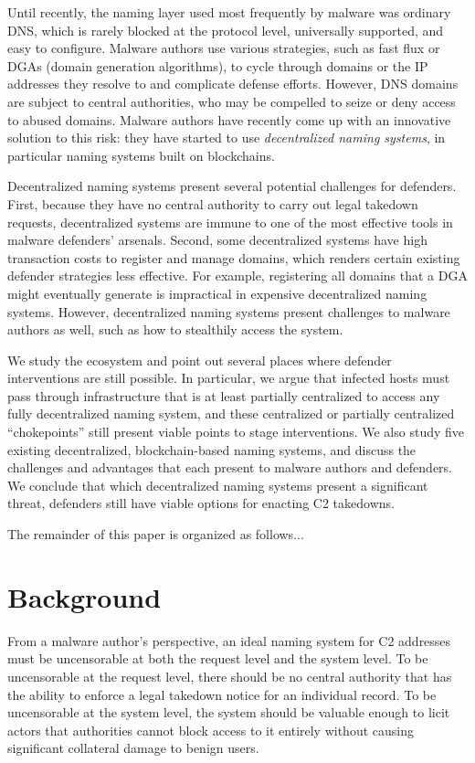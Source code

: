 \documentclass[conference]{IEEEtran}
\begin{document}
Until recently, the naming layer used most frequently by malware was ordinary DNS, which is rarely 
blocked at the protocol level, universally supported, and easy to configure. Malware authors use 
various strategies, such as fast flux or DGAs (domain generation algorithms), to cycle through domains 
or the IP addresses they resolve to and complicate defense efforts. However, DNS domains are subject 
to central authorities, who may be compelled to seize or deny access to abused domains. Malware 
authors have recently come up with an innovative solution to this risk: they have started to use 
\emph{decentralized naming systems}, in particular naming systems built on blockchains. 

Decentralized naming systems present several potential challenges for defenders. First, because they 
have no central authority to carry out legal takedown requests, decentralized systems are immune to 
one of the most effective tools in malware defenders' arsenals. Second, some decentralized systems 
have high transaction costs to register and manage domains, which renders certain existing defender 
strategies less effective. For example, registering all domains that a DGA might eventually generate 
is impractical in expensive decentralized naming systems. However, decentralized naming systems 
present challenges to malware authors as well, such as how to stealthily access the system.

We study the ecosystem and point out several places where defender interventions are still possible. 
In particular, we argue that infected hosts must pass through infrastructure that is at least 
partially centralized to access any fully decentralized naming system, and these centralized or 
partially centralized ``chokepoints'' still present viable points to stage interventions. We also 
study five existing decentralized, blockchain-based naming systems, and discuss the challenges and 
advantages that each present to malware authors and defenders. We conclude that which decentralized 
naming systems present a significant threat, defenders still have viable options for enacting C2 
takedowns.

The remainder of this paper is organized as follows...

\section{Background}

From a malware author's perspective, an ideal naming system for C2 
addresses must be uncensorable at both the request level and the system level. To be 
uncensorable at the request level, there should be no central authority that 
has the ability to enforce a legal takedown notice for an individual record. To 
be uncensorable at the system level, the system should be valuable enough to 
licit actors that authorities cannot block access to it entirely without 
causing significant collateral damage to benign users.
\end{document}
